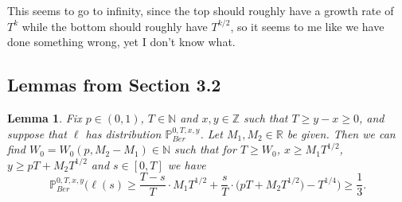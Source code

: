 \documentclass[12pt]{article}
\newtheorem{lemma}{Lemma}
\begin{document}
This seems to go to infinity, since the top should roughly have a growth rate of $T^k$ while the bottom should roughly have $T^{k/2}$, so it seems to me like we have done something wrong, yet I don't know what. 


	\subsection*{Lemmas from Section 3.2}
	
	\begin{lemma}\label{LemmaHalfS4} Fix $p \in (0,1)$, $T \in \mathbb{N}$ and $x, y\in \mathbb{Z}$ such that $T \geq y-x \geq 0$, and suppose that $\ell$ has distribution $\mathbb{P}^{0,T,x,y}_{Ber}$. Let $M_1, M_2 \in \mathbb{R}$ be given. Then we can find $W_0 = W_0(p,M_2 - M_1) \in \mathbb{N}$ such that for $T \geq W_0$, $x \geq M_1 T^{1/2}$, $y \geq pT + M_2 T^{1/2}$ and $s \in [0,T]$ we have
		\begin{equation}\label{halfEq1S4}
		\mathbb{P}^{0,T,x,y}_{Ber}\Big( \ell(s)  \geq \frac{T-s}{T} \cdot M_1 T^{1/2} + \frac{s}{T} \cdot \big(p T + M_2 T^{1/2}\big) - T^{1/4} \Big) \geq \frac{1}{3}.
		\end{equation}
	\end{lemma}
\end{document}
